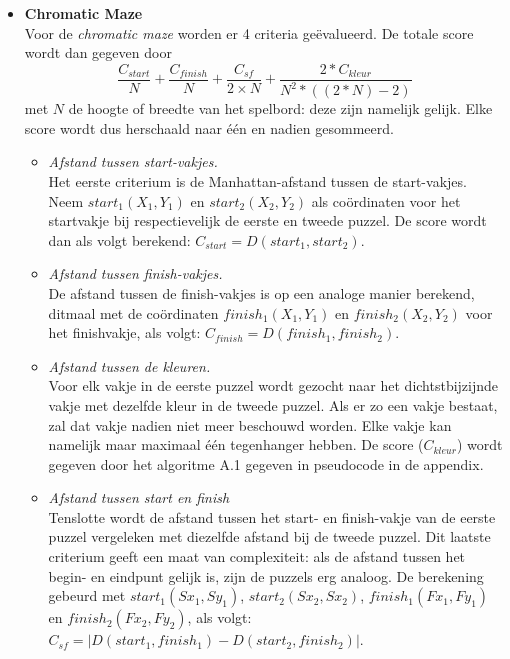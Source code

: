 \documentclass{article}
\begin{document}
\begin{itemize}
\item \textbf{Chromatic Maze}\\
Voor de \textit{chromatic maze} worden er 4 criteria ge\"evalueerd. De totale score wordt dan gegeven door $$\frac{C_{start}}{N} + \frac{C_{finish}}{N} + \frac{C_{sf}}{2\times N} + \frac{2 * C_{kleur}}{N^2 * ((2*N)-2)}$$ met $N$ de hoogte of breedte van het spelbord: deze zijn namelijk gelijk. Elke score wordt dus herschaald naar \'e\'en en nadien gesommeerd.
\begin{itemize}

\item \textit{Afstand tussen start-vakjes.}\\
Het eerste criterium is de Manhattan-afstand tussen de start-vakjes. Neem $start_1(X_1, Y_1)$ en $start_2(X_2, Y_2)$ als co\"ordinaten voor het startvakje bij respectievelijk de eerste en tweede puzzel. De score wordt dan als volgt berekend: $C_{start} = D(start_1, start_2)$.
\item \textit{Afstand tussen finish-vakjes.}\\
De afstand tussen de finish-vakjes is op een analoge manier berekend, ditmaal met de co\"ordinaten $finish_1(X_1, Y_1)$ en $finish_2(X_2, Y_2)$ voor het finishvakje, als volgt: $C_{finish} = D(finish_1, finish_2)$.

\item \textit{Afstand tussen de kleuren.}\\
  Voor elk vakje in de eerste puzzel wordt gezocht naar het dichtstbijzijnde vakje met dezelfde kleur in de tweede puzzel. Als er zo een vakje bestaat, zal dat vakje nadien niet meer beschouwd worden. Elke vakje kan namelijk maar maximaal \'e\'en tegenhanger hebben. De score ($C_{kleur}$) wordt gegeven door het algoritme A.1 gegeven in pseudocode in de appendix.

\item \textit{Afstand tussen start en finish}\\
Tenslotte wordt de afstand tussen het start- en finish-vakje van de eerste puzzel vergeleken met diezelfde afstand bij de tweede puzzel. Dit laatste criterium geeft een maat van complexiteit: als de afstand tussen het begin- en eindpunt gelijk is, zijn de puzzels erg analoog. De berekening gebeurd met $start_1(Sx_1, Sy_1)$, $start_2(Sx_2, Sx_2)$, $finish_1(Fx_1, Fy_1)$ en $finish_2(Fx_2, Fy_2)$, als volgt: $C_{sf} = |D(start_1, finish_1) - D(start_2, finish_2)|$.


\end{itemize}
\end{itemize}
\end{document}
